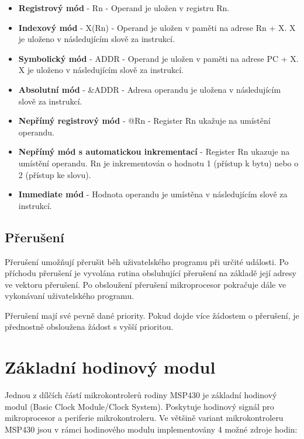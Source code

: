 \begin{itemize}
\item \textbf{Registrový mód} - Rn - Operand je uložen v registru Rn.
\item \textbf{Indexový mód} - X(Rn) - Operand je uložen v paměti na adrese Rn + X. X je uloženo v následujícím slově za instrukcí.
\item \textbf{Symbolický mód} - ADDR - Operand je uložen v paměti na adrese PC + X. X je uloženo v následujícím slově za instrukcí.
\item \textbf{Absolutní mód} - \&ADDR - Adresa operandu je uložena v následujícím slově za instrukcí.
\item \textbf{Nepřímý registrový mód} - @Rn - Register Rn ukažuje na umístění operandu.
\item \textbf{Nepřímý mód s automatickou inkrementací} - Register Rn ukazuje na umístění operandu. Rn je inkrementován o hodnotu 1 (přístup k bytu) nebo o 2 (přístup ke slovu).
\item \textbf{Immediate mód} - Hodnota operandu je umístěna v následujícím slově za instrukcí.
\end{itemize}

\subsection{Přerušení}

Přerušení umožňují přerušit běh uživatelského programu při určité události. Po příchodu přerušení je vyvolána rutina obsluhující přerušení na základě její adresy ve vektoru přerušení. Po obsloužení přerušení mikroprocesor pokračuje dále ve vykonávaní uživatelského programu.

Přerušení mají své pevně dané priority. Pokud dojde více žádostem o přerušení, je přednostně obsloužena žádost s vyšší prioritou.

\section{Základní hodinový modul}

Jednou z dílčích částí mikrokontrolerů rodiny MSP430 je základní hodinový modul (Basic Clock Module/Clock System). Poskytuje hodinový signál pro mikroprocesor a periferie mikrokontroleru. Ve většině variant mikrokontroleru MSP430 jsou v rámci hodinového modulu implementovány 4 možné zdroje hodin:

